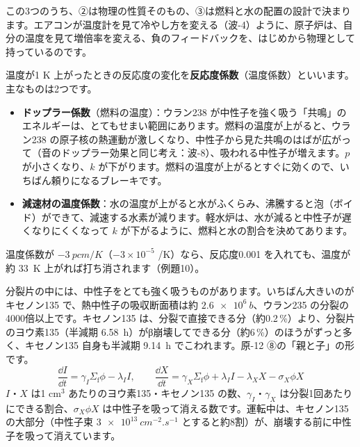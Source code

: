 この3つのうち、②は物理の性質そのもの、③は燃料と水の配置の設計で決まります。エアコンが温度計を見て冷やし方を変える（波-4）ように、原子炉は、自分の温度を見て増倍率を変える、負のフィードバックを、はじめから物理として持っているのです。

\label{ph:原-15:sec10}
温度が1 K 上がったときの反応度の変化を\textbf{反応度係数}（温度係数）といいます。主なものは2つです。
\begin{itemize}[leftmargin=1.6\zw, itemsep=1pt, topsep=2pt]
\item \textbf{ドップラー係数}（燃料の温度）：ウラン238 が中性子を強く吸う「共鳴」のエネルギーは、とてもせまい範囲にあります。燃料の温度が上がると、ウラン238 の原子核の熱運動が激しくなり、中性子から見た共鳴のはばが広がって（音のドップラー効果と同じ考え：波-8）、吸われる中性子が増えます。$p$ が小さくなり、$k$ が下がります。燃料の温度が上がるとすぐに効くので、いちばん頼りになるブレーキです。
\item \textbf{減速材の温度係数}：水の温度が上がると水がふくらみ、沸騰すると泡（ボイド）ができて、減速する水素が減ります。軽水炉は、水が減ると中性子が遅くなりにくくなって $k$ が下がるように、燃料と水の割合を決めてあります。
\end{itemize}
温度係数が $-\qty{3}{pcm/K}$（$-3\times10^{-5}$ /K）なら、反応度0.001 を入れても、温度が約 \qty{33}{K} 上がれば打ち消されます（例題10）。

分裂片の中には、中性子をとても強く吸うものがあります。いちばん大きいのがキセノン135 で、熱中性子の吸収断面積は約 $\qty{2.6e6}{b}$、ウラン235 の分裂の4000倍以上です。キセノン135 は、分裂で直接できる分（約0.2\,\%）より、分裂片のヨウ素135（半減期 \qty{6.58}{h}）がβ崩壊してできる分（約6\,\%）のほうがずっと多く、キセノン135 自身も半減期 \qty{9.14}{h} でこわれます。原-12 ⑧の「親と子」の形です。
\[ \frac{\dd I}{\dd t}=\gamma_I\Sigma_{\mathrm f}\phi-\lambda_II,\qquad \frac{\dd X}{\dd t}=\gamma_X\Sigma_{\mathrm f}\phi+\lambda_II-\lambda_XX-\sigma_X\phi X \]
$I$・$X$ は1 cm$^3$ あたりのヨウ素135・キセノン135 の数、$\gamma_I$・$\gamma_X$ は分裂1回あたりにできる割合、$\sigma_X\phi X$ は中性子を吸って消える数です。運転中は、キセノン135 の大部分（中性子束 $\qty{3e13}{cm^{-2}.s^{-1}}$ とすると約8割）が、崩壊する前に中性子を吸って消えています。


